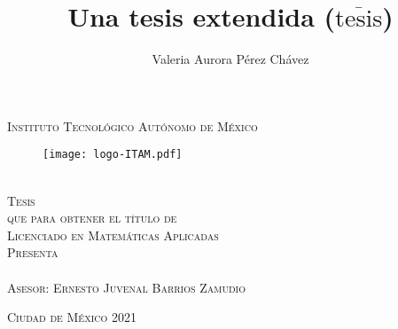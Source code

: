 \documentclass[11pt, oneside]{book}
\begin{document}



\title{Una tesis extendida ($\overline{\text{tesis}}$)} 
\author{Valeria Aurora Pérez Chávez}

\begin{titlepage}
\begin{center}

\textsc{\Large Instituto Tecnológico Autónomo de México}\\[2em]

\begin{figure}[h]
\begin{center}
\texttt{[image: logo-ITAM.pdf]}
\end{center}
\end{figure}


\textbf{\LARGE \thetitle}\\[2em]

\textsc{\large Tesis}\\[1em]

\textsc{\large que para obtener el título de}\\[1em]

\textsc{\LARGE Licenciado en Matemáticas Aplicadas}\\[1em]

\textsc{\large Presenta}\\[1em]

\textsc{\LARGE \theauthor}\\[1em]

\textsc{\large Asesor: Ernesto Juvenal Barrios Zamudio}\\[1em]



\end{center}

\vspace*{\fill}
\textsc{Ciudad de México \hspace*{\fill} 2021} %

\end{titlepage}



\end{document}
